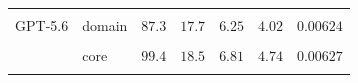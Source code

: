 \begin{table}[H]
\begin{tabular}{ll*{5}{c}}
 &  & \cellcolor{llpC} & \cellcolor{llpD}{\color{llpSpread}{\scriptsize$[7.88,\,16.8]$}} & \cellcolor{llpC}{\color{llpSpread}{\scriptsize$[2.42,\,7.15]$}} & \cellcolor{llpC}{\color{llpSpread}{\scriptsize$[1.56,\,5.01]$}} & \cellcolor{llpC}{\scriptsize$[0.00487,\,0.00555]$} \\[2pt]
GPT-5.6 & domain & \cellcolor{llpC}$87.3$ & \cellcolor{llpC}$17.7$ & \cellcolor{llpC}$6.25$ & \cellcolor{llpC}$4.02$ & \cellcolor{llpA}$0.00624$ \\
 &  & \cellcolor{llpC}{\scriptsize$[84.1,\,91.3]$} & \cellcolor{llpC}{\scriptsize$[17.2,\,19.9]$} & \cellcolor{llpC}{\scriptsize$[5.86,\,7.37]$} & \cellcolor{llpC}{\scriptsize$[3.89,\,5.20]$} & \cellcolor{llpA}{\scriptsize$[0.00607,\,0.00646]$} \\[2pt]
 & core & \cellcolor{llpB}$99.4$ & \cellcolor{llpC}$18.5$ & \cellcolor{llpB}$6.81$ & \cellcolor{llpA}$4.74$ & \cellcolor{llpA}$0.00627$ \\
 &  & \cellcolor{llpB}{\scriptsize$[84.7,\,111]$} & \cellcolor{llpC}{\scriptsize$[18.0,\,21.3]$} & \cellcolor{llpB}{\scriptsize$[6.29,\,8.15]$} & \cellcolor{llpA}{\scriptsize$[4.20,\,5.25]$} & \cellcolor{llpA}{\scriptsize$[0.00572,\,0.00716]$} \\
\bottomrule
\end{tabular}
\end{table}
